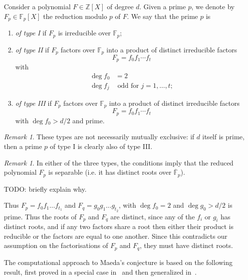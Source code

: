 \documentclass[11pt]{article}
\theoremstyle{plain}
\theoremstyle{definition}
\theoremstyle{remark}
\newtheorem{remark}[theorem]{Remark}
\numberwithin{equation}{section}
\numberwithin{table}{section}
\newcommand{\ZZ}{\mathbb{Z}}
\newcommand{\FF}{\mathbb{F}}
\begin{document}
Consider a polynomial $F\in\ZZ[X]$ of degree $d$.
Given a prime $p$, we denote by
$F_p\in\FF_p[X]$ the reduction modulo $p$ of $F$.  We say that the prime
$p$ is
\begin{enumerate}
  \item \emph{of type I} if $F_p$ is irreducible over $\FF_p$;
  \item \emph{of type II} if $F_p$ factors over $\FF_p$ into a product of
    distinct irreducible factors
    \begin{equation*}
      F_p=f_0f_1\cdots f_t
    \end{equation*}
    with
    \begin{align*}
      \deg f_0 &= 2\\
      \deg f_j &\text{ odd for }j=1,\ldots,t;
    \end{align*}
  \item \emph{of type III} if $F_p$ factors over $\FF_p$ into a product of
    distinct irreducible factors
    \begin{equation*}
      F_p=f_0f_1\cdots f_t
    \end{equation*}
    with $\deg f_0>d/2$ and prime.
\end{enumerate}

\begin{remark}
These types are not necessarily mutually exclusive: if $d$ itself is
prime, then a prime $p$ of type I is clearly also of type III.
\end{remark}

\begin{remark}
In either of the three types, the conditions imply that the reduced polynomial
$F_p$ is separable (i.e. it has distinct roots over $\overline{\FF}_p$).

TODO: briefly explain why.
  
Thus $F_p = f_0 f_1 \ldots f_{t_1}$ and
  $F_q = g_0 g_1 \ldots g_{t_2}$, with $\deg f_0 = 2$ and $\deg g_0 > d/2$ is prime.
  Thus the roots of $F_p$ and $F_q$ are distinct, since any of the $f_i$ or $g_i$ has
  distinct roots, and if any two factors share a root then either their product is
  reducible or the factors are equal to one another. Since this contradicts our
  assumption on the factorisations of $F_p$ and $F_q$, they must have distinct roots.
\end{remark}

The computational approach to Maeda's conjecture is based on the following
result, first proved in a special case in~\cite{Buzzard} and then generalized
in~\cite{ConreyFarmer}.
\end{document}
